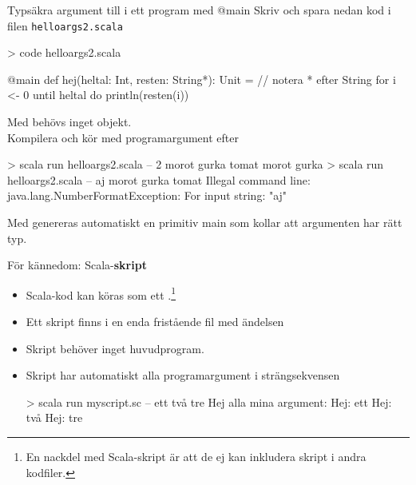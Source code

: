 \begin{Slide}{Typsäkra argument till i ett program med @main}
  \SlideFontSmall
Skriv och spara nedan kod i filen \texttt{helloargs2.scala}
\begin{REPLnonum}
> code helloargs2.scala
\end{REPLnonum}
\begin{Code}
@main def hej(heltal: Int, resten: String*): Unit =  // notera * efter String
  for i <- 0 until heltal do println(resten(i))
\end{Code}
Med  behövs inget objekt.\\
Kompilera och kör med programargument efter \code{--}
\begin{REPL}
> scala run helloargs2.scala -- 2 morot gurka tomat
morot
gurka
> scala run helloargs2.scala -- aj morot gurka tomat
Illegal command line: java.lang.NumberFormatException: For input string: "aj"
\end{REPL}
Med  genereras automatiskt en primitiv main som kollar att argumenten har rätt typ.
\end{Slide}


\begin{Slide}{För kännedom: Scala-\textbf{skript}}
\begin{itemize}
  \SlideFontSmall
  \item 
Scala-kod kan köras som ett .\footnote{\SlideFontTiny En nackdel med Scala-skript är att de ej kan inkludera skript i andra kodfiler.
}
\item Ett skript finns i en enda fristående fil med ändelsen 
\item Skript behöver inget huvudprogram. 
\item Skript har automatiskt alla programargument i strängsekvensen 

\begin{REPLnonum}
> scala run myscript.sc -- ett två tre
Hej alla mina argument:
Hej: ett
Hej: två
Hej: tre
\end{REPLnonum}
\end{itemize}
\end{Slide}





